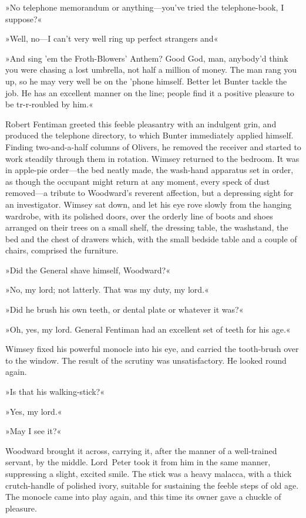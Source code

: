 »No telephone memorandum or anything—you've tried the telephone-book, I suppose?«

»Well, no—I can't very well ring up perfect strangers and\longdash«

»And sing 'em the Froth-Blowers' Anthem? Good God, man, anybody'd think you were chasing a lost umbrella, not half a million of money. The man rang you up, so he may very well be on the 'phone himself. Better let Bunter tackle the job. He has an excellent manner on the line; people find it a positive pleasure to be tr-r-roubled by him.«

Robert Fentiman greeted this feeble pleasantry with an indulgent grin, and produced the telephone directory, to which Bunter immediately applied himself. Finding two-and-a-half columns of Olivers, he removed the receiver and started to work steadily through them in rotation. Wimsey returned to the bedroom. It was in apple-pie order—the bed neatly made, the wash-hand apparatus set in order, as though the occupant might return at any moment, every speck of dust removed—a tribute to Woodward's reverent affection, but a depressing sight for an investigator. Wimsey sat down, and let his eye rove slowly from the hanging wardrobe, with its polished doors, over the orderly line of boots and shoes arranged on their trees on a small shelf, the dressing table, the washstand, the bed and the chest of drawers which, with the small bedside table and a couple of chairs, comprised the furniture.

»Did the General shave himself, Woodward?«

»No, my lord; not latterly. That was my duty, my lord.«

»Did he brush his own teeth, or dental plate or whatever it was?«

»Oh, yes, my lord. General Fentiman had an excellent set of teeth for his age.«

Wimsey fixed his powerful monocle into his eye, and carried the tooth-brush over to the window. The result of the scrutiny was unsatisfactory. He looked round again.

»Is that his walking-stick?«

»Yes, my lord.«

»May I see it?«

Woodward brought it across, carrying it, after the manner of a well-trained servant, by the middle. Lord~Peter took it from him in the same manner, suppressing a slight, excited smile. The stick was a heavy malacca, with a thick crutch-handle of polished ivory, suitable for sustaining the feeble steps of old age. The monocle came into play again, and this time its owner gave a chuckle of pleasure.


